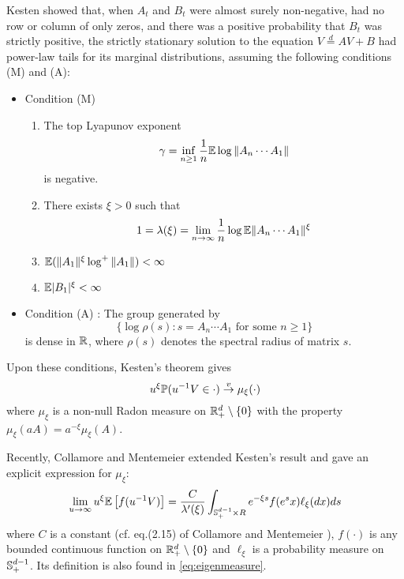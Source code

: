 Kesten \cite{kesten:1973} showed that, when $A_t$ and $B_t$ were almost
surely non-negative, had no row or column of only zeros, and there was
a positive probability that $B_t$ was strictly positive, the strictly
stationary solution to the equation
$V \overset{d}{=} A V + B$ had power-law tails
for its marginal distributions, assuming the following conditions (M)
and (A):
\begin{itemize}
\item Condition (M)
  \begin{enumerate}
  \item The top Lyapunov exponent
    \[
    \gamma = \inf_{n \geq 1} {1 \over n}\E \log \|A_n \cdots A_1\|
    \]
    is negative.
  \item There exists $\xi > 0$ such that
    \[
    1 = \lambda(\xi) = \lim_{n \to \infty} {1 \over n} \log \E \|A_n \cdots A_1\|^\xi
    \]
  \item $\E (\|A_1\|^\xi \log^+\|A_1\|) < \infty$
  \item $\E |B_1|^\xi < \infty$
  \end{enumerate}
\item Condition (A) : The group generated by
  \[
  \{\log\rho(s): s = A_n \cdots A_1 \text{ for some } n \geq 1\}
  \]
  is dense in $\reals$, where $\rho(s)$ denotes the spectral
  radius of matrix $s$.
\end{itemize}
Upon these conditions, Kesten's theorem gives
\begin{equation*}
  u^\xi \P(u^{-1} V \in \cdot) \overset{v}{\to} \mu_\xi(\cdot)
\end{equation*}
where $\mu_\xi$ is a non-null Radon measure on
$\reals^d_+ \setminus \{0\}$ with the property
$\mu_\xi(a A) = a^{-\xi} \mu_\xi(A)$.

Recently, Collamore and Mentemeier \cite{collamore:mentemeier:2016}
extended Kesten's result and gave an explicit expression for $\mu_\xi$:
\begin{equation}
  \label{eq:CollamoreMentemeierIntro}
  \lim_{u \to \infty} u^{\xi} \E \left[
    f(u^{-1} V)
    \right]
  =
  {C \over \lambda'(\xi)}  
  \int_{\sphere^{d-1}_+ \times R} e^{-\xi s} f(e^s x) \ell_\xi(dx) ds
\end{equation}
where $C$ is a constant (cf. eq.(2.15) of Collamore and Mentemeier
\cite{collamore:mentemeier:2016}), $f(\cdot)$ is any bounded
continuous function on $\reals^{d}_+ \setminus \{0\}$  and
$\ell_\xi$ is a probability measure on $\sphere_+^{d-1}$. Its definition
is also found in \eqref{eq:eigenmeasure}.

